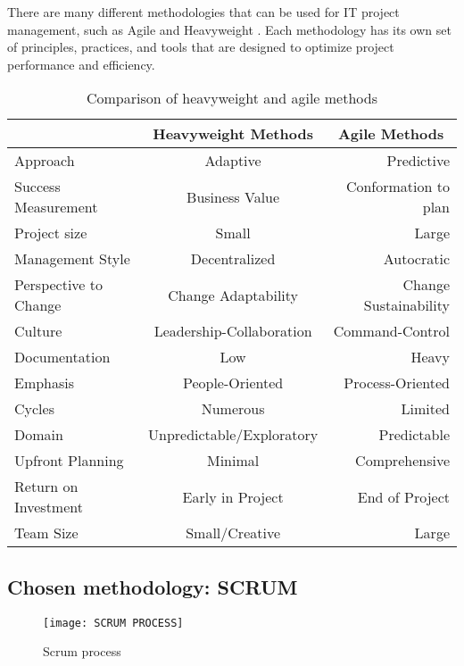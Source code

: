 \vspace{0.25cm}
There are many different methodologies that can be used for IT project management, such as Agile\cite{Aw15} and Heavyweight\cite{Aw15} . Each methodology has its own set of principles, practices, and tools that are designed to optimize project performance and efficiency.


\begin{table}[ht]

\centering
\begin{tabular}{|l|c|r|}
\hline
\multicolumn{1}{|l|}{         } & \multicolumn{1}{|c|}{Heavyweight Methods}& \multicolumn{1}{|c|}{Agile Methods} \\
\hline
Approach & Adaptive  & Predictive  \\
\hline
Success Measurement & Business Value & Conformation to plan \\
\hline
Project size & Small & Large \\
\hline
Management Style & Decentralized & Autocratic \\
\hline
Perspective to Change & Change Adaptability & Change Sustainability \\
\hline
Culture & Leadership-Collaboration & Command-Control \\
\hline
Documentation & Low & Heavy \\
\hline
Emphasis & People-Oriented & Process-Oriented \\
\hline
Cycles & Numerous & Limited \\
\hline
Domain & Unpredictable/Exploratory & Predictable \\
\hline
Upfront Planning & Minimal & Comprehensive \\
\hline
Return on Investment & Early in Project & End of Project \\
\hline
Team Size & Small/Creative & Large \\
\hline
\end{tabular}
\caption{Comparison of heavyweight and agile methods \cite{PGC10}}
\label{table:comparison}
\end{table}


\newpage
\subsection{Chosen methodology: SCRUM}
\FloatBarrier
\begin{figure}[h]
         \centering
        \texttt{[image: SCRUM PROCESS]}
   
        \caption{Scrum process}
        \label{fig:Scrum process}
    \end{figure}
\FloatBarrier
   
